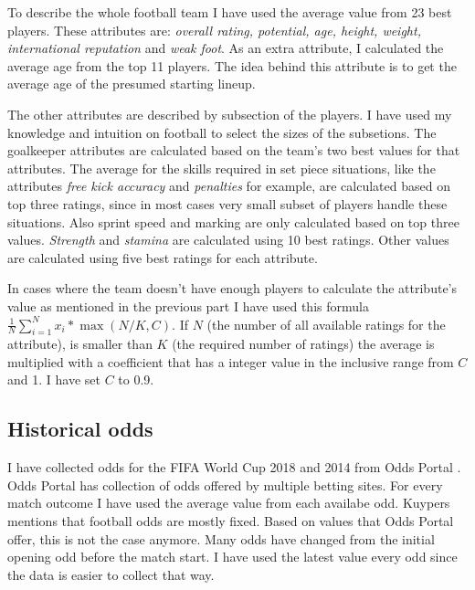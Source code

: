 To describe the whole football team I have used the average value from 23 best players. These attributes are: \textit{overall rating, potential, age, height, weight, international reputation} and \textit{weak foot}. As an extra attribute, I calculated the average age from the top 11 players. The idea behind this attribute is to get the average age of the presumed starting lineup.

The other attributes are described by subsection of the players. I have used my knowledge and intuition on football to select the sizes of the subsetions. The goalkeeper attributes are calculated based on the team's two best values for that attributes. The average for the skills required in set piece situations, like the attributes \textit{free kick accuracy} and \textit{penalties} for example, are calculated based on top three ratings, since in most cases very small subset of players handle these situations. Also sprint speed and marking are only calculated based on top three values. \textit{Strength} and \textit{stamina} are calculated using 10 best ratings. Other values are calculated using five best ratings for each attribute.

In cases where the team doesn't have enough players to calculate the attribute's value as mentioned in the previous part I have used this formula $\frac{1}{N}\sum_{i=1}^{N}x_i * \max{(N/K, C)}$. If $N$ (the number of all available ratings for the attribute), is smaller than $K$ (the required number of ratings) the average is multiplied with a coefficient that has a integer value in the inclusive range from $C$ and 1. I have set $C$ to 0.9.

\subsection{Historical odds}
I have collected odds for the FIFA World Cup 2018 and 2014 from Odds Portal \cite{oddsportal}. Odds Portal has collection of odds offered by multiple betting sites. For every match outcome I have used the average value from each availabe odd. Kuypers \cite{kuypers2008} mentions that football odds are mostly fixed. Based on values that Odds Portal offer, this is not the case anymore. Many odds have changed from the initial opening odd before the match start. I have used the latest value every odd since the data is easier to collect that way.